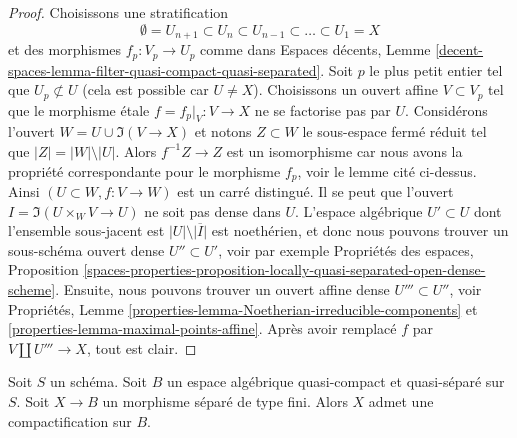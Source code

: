 \begin{proof}
Choisissons une stratification
$$
\emptyset = U_{n + 1} \subset
U_n \subset U_{n - 1} \subset \ldots \subset U_1 = X
$$
et des morphismes $f_p : V_p \to U_p$ comme dans Espaces décents, Lemme
\ref{decent-spaces-lemma-filter-quasi-compact-quasi-separated}.
Soit $p$ le plus petit entier tel que $U_p \not \subset U$
(cela est possible car $U \not = X$). Choisissons un ouvert affine $V \subset V_p$
tel que le morphisme \'etale $f = f_p|_V : V \to X$ ne se factorise pas par $U$.
Considérons l'ouvert $W = U \cup \Im(V \to X)$ et notons $Z \subset W$ le sous-espace fermé réduit tel que $|Z| = |W| \setminus |U|$.
Alors $f^{-1}Z \to Z$ est un isomorphisme car nous avons la
propriété correspondante pour le morphisme $f_p$, voir le lemme cité ci-dessus.
Ainsi $(U \subset W, f : V \to W)$ est un carré distingué.
Il se peut que l'ouvert $I = \Im(U \times_W V \to U)$
ne soit pas dense dans $U$. L'espace algébrique $U' \subset U$ dont l'ensemble
sous-jacent est $|U| \setminus \overline{|I|}$ est noethérien, et donc nous pouvons trouver un sous-schéma ouvert dense $U'' \subset U'$, voir par exemple Propriétés des espaces, Proposition \ref{spaces-properties-proposition-locally-quasi-separated-open-dense-scheme}. Ensuite, nous pouvons trouver un ouvert affine dense $U''' \subset U''$, voir Propriétés, Lemme \ref{properties-lemma-Noetherian-irreducible-components} et \ref{properties-lemma-maximal-points-affine}. Après avoir remplacé $f$ par $V \amalg U''' \to X$, tout est clair. 
\end{proof}

\begin{theorem}
\label{theorem-nagata}
\begin{reference}
\cite{CLO}
\end{reference}
Soit $S$ un schéma. Soit $B$ un espace algébrique quasi-compact et
quasi-séparé sur $S$. Soit $X \to B$ un morphisme séparé de type fini.
Alors $X$ admet une compactification sur $B$.
\end{theorem}

